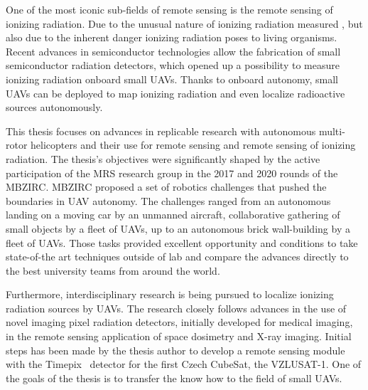 \documentclass[a4paper,11pt,titlepage,twoside]{book}
\begin{document}
One of the most iconic sub-fields of remote sensing is the remote sensing of ionizing radiation.
Due to the unusual nature of ionizing radiation measured \cite{andreo2017fundamentals}, but also due to the inherent danger ionizing radiation poses to living organisms.
Recent advances in semiconductor technologies allow the fabrication of small semiconductor radiation detectors, which opened up a possibility to measure ionizing radiation onboard small \acp{UAV}.
Thanks to onboard autonomy, small \acp{UAV} can be deployed to map ionizing radiation and even localize radioactive sources autonomously.

This thesis focuses on advances in replicable research with autonomous multi-rotor helicopters and their use for remote sensing and remote sensing of ionizing radiation.
The thesis's objectives were significantly shaped by the active participation of the \ac{MRS} research group in the 2017 and 2020 rounds of the \ac{MBZIRC}.
MBZIRC proposed a set of robotics challenges that pushed the boundaries in \ac{UAV} autonomy.
The challenges ranged from an autonomous landing on a moving car by an unmanned aircraft, collaborative gathering of small objects by a fleet of \acp{UAV}, up to an autonomous brick wall-building by a fleet of \acp{UAV}.
Those tasks provided excellent opportunity and conditions to take state-of-the art techniques outside of lab and compare the advances directly to the best university teams from around the world.

Furthermore, interdisciplinary research is being pursued to localize ionizing radiation sources by \acp{UAV}.
The research closely follows advances in the use of novel imaging pixel radiation detectors, initially developed for medical imaging, in the remote sensing application of space dosimetry and X-ray imaging.
Initial steps has been made by the thesis author to develop a remote sensing module with the Timepix~\cite{llopart2007timepix} detector for the first Czech CubeSat, the VZLUSAT-1.
One of the goals of the thesis is to transfer the know how to the field of small \aclp{UAV}.
\end{document}
